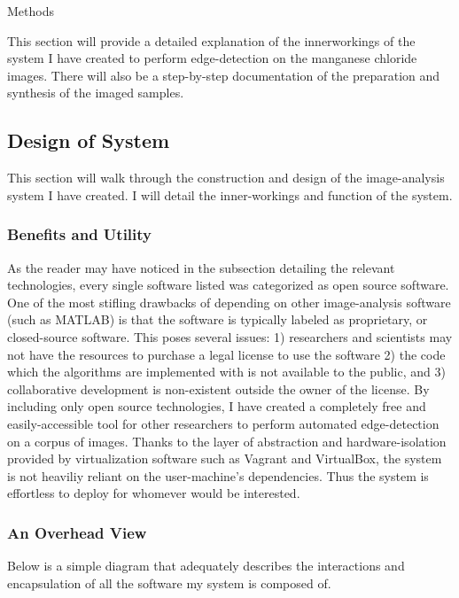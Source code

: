\documentclass[a4paper,12pt]{article}
\begin{document}
\newpage
\begin{section}{Methods}

This section will provide a detailed explanation of the innerworkings of the system I have created to perform edge-detection on the manganese chloride images. There will also be a step-by-step documentation of the preparation and synthesis of the imaged samples.


\subsection{Design of System}

This section will walk through the construction and design of the image-analysis system I have created. I will detail the inner-workings and function of the system.

\subsubsection{Benefits and Utility}

As the reader may have noticed in the subsection detailing the relevant technologies, every single software listed was categorized as open source software. One of the most stifling drawbacks of depending on other image-analysis software (such as MATLAB) is that the software is typically labeled as proprietary, or closed-source software. This poses several issues: 1) researchers and scientists may not have the resources to purchase a legal license to use the software 2) the code which the algorithms are implemented with is not available to the public, and 3) collaborative development is non-existent outside the owner of the license. By including only open source technologies, I have created a completely free and easily-accessible tool for other researchers to perform automated edge-detection on a corpus of images. Thanks to the layer of abstraction and hardware-isolation provided by virtualization software such as Vagrant and VirtualBox, the system is not heaviliy reliant on the user-machine's dependencies. Thus the system is effortless to deploy for whomever would be interested. 

\subsubsection{An Overhead View}

Below is a simple diagram that adequately describes the interactions and encapsulation of all the software my system is composed of.


\end{section}
\end{document}
